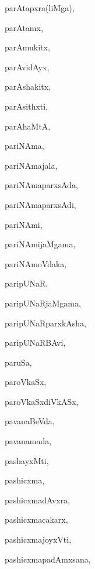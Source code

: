\begin{multicols}{3}
{\noindent
{parAtapxra(liMga)}, \pageref{parAtapxraliMga}

\noindent
{parAtamx}, \pageref{parAtamx}

\noindent
{parAmukitx}, \pageref{parAmukitx}

\noindent
{parAvidAyx}, \pageref{parAvidAyx}

\noindent
{parAshakitx}, \pageref{parAshakitx}

\noindent
{parAsithxti}, \pageref{parAsithxti}

\noindent
{parAhaMtA}, \pageref{parAhaMtA}

\noindent
{pariNAma}, \pageref{pariNAma}

\noindent
{pariNAmajala}, \pageref{pariNAmajala}

\noindent
{pariNAmaparxsAda}, \pageref{pariNAmaparxsAda}

\noindent
{pariNAmaparxsAdi}, \pageref{pariNAmaparxsAdi}

\noindent
{pariNAmi}, \pageref{pariNAmi}

\noindent
{pariNAmijaMgama}, \pageref{pariNAmijaMgama}

\noindent
{pariNAmoVdaka}, \pageref{pariNAmoVdaka}

\noindent
{paripUNaR}, \pageref{paripUNaR}

\noindent
{paripUNaRjaMgama}, \pageref{paripUNaRjaMgama}

\noindent
{paripUNaRparxkAsha}, \pageref{paripUNaRparxkAsha}

\noindent
{paripUNaRBAvi}, \pageref{paripUNaRBAvi}

\noindent
{paruSa}, \pageref{paruSa}

\noindent
{paroVkaSx}, \pageref{paroVkaSx}

\noindent
{paroVkaSxdiVkASx}, \pageref{paroVkaSxdiVkASx}

\noindent
{pavanaBeVda}, \pageref{pavanaBeVda}

\noindent
{pavanamada}, \pageref{pavanamada}

\noindent
{pashayxMti}, \pageref{pashayxMti}

\noindent
{pashicxma}, \pageref{pashicxma}

\noindent
{pashicxmadAvxra}, \pageref{pashicxmadAvxra}

\noindent
{pashicxmacakarx}, \pageref{pashicxmacakarx}

\noindent
{pashicxmajoyxVti}, \pageref{pashicxmajoyxVti}

\noindent
{pashicxmapadAmxsana}, \pageref{pashicxmapadAmxsana}

}
\end{multicols}
